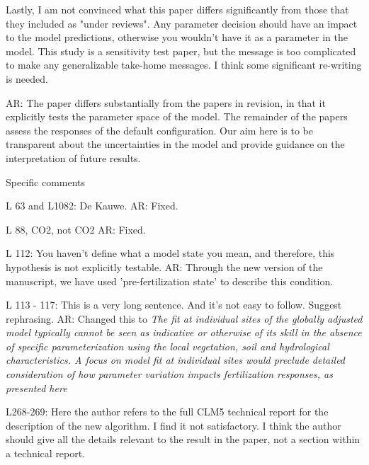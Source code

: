 \documentclass{article}
\begin{document}
{Lastly, I am not convinced what this paper differs significantly from those that they included as "under reviews". Any parameter decision should have an impact to the model predictions, otherwise you wouldn't have it as a parameter in the model. This study is a sensitivity test paper, but the message is too complicated to make any generalizable take-home messages. I think some significant re-writing is needed. 

\textsf{AR: The paper differs substantially from the papers in revision, in that it explicitly tests the parameter space of the model.  The remainder of the papers assess the responses of the default configuration. Our aim here is to be transparent about the uncertainties in the model and provide guidance on the interpretation of future results.} 

Specific comments 

L 63 and L1082: De Kauwe. 
\textsf{AR: Fixed.}

L 88, CO2, not CO2 
\textsf{AR: Fixed.}

L 112: You haven't define what a model state you mean, and therefore, this hypothesis is not explicitly testable. 
\textsf{AR: Through the new version of the manuscript, we have used 'pre-fertilization state' to describe this condition. }

L 113 - 117: This is a very long sentence. And it's not easy to follow. Suggest rephrasing.
\textsf{AR: Changed this to \emph{ The fit at individual sites of the globally adjusted model typically cannot be seen as indicative or otherwise of its skill in the absence of specific parameterization using the local vegetation, soil and hydrological characteristics. A focus on model fit at individual sites would preclude detailed consideration of how parameter variation impacts fertilization responses, as presented here}}

L268-269: Here the author refers to the full CLM5 technical report for the description of the new algorithm. I find it not satisfactory. I think the author should give all the details relevant to the result in the paper, not a section within a technical report. 

}
\end{document}
